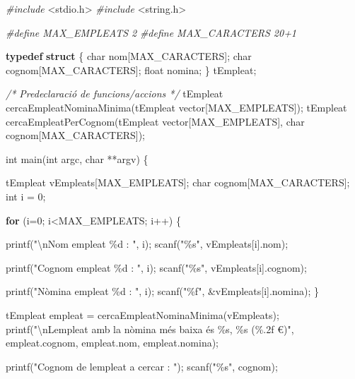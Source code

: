 \documentclass[]{book}
\newenvironment{Shaded}{\begin{snugshade}}{\end{snugshade}}
\newcommand{\CommentTok}[1]{\textcolor[rgb]{0.56,0.35,0.01}{\textit{#1}}}
\newcommand{\ControlFlowTok}[1]{\textcolor[rgb]{0.13,0.29,0.53}{\textbf{#1}}}
\newcommand{\DataTypeTok}[1]{\textcolor[rgb]{0.13,0.29,0.53}{#1}}
\newcommand{\DecValTok}[1]{\textcolor[rgb]{0.00,0.00,0.81}{#1}}
\newcommand{\ImportTok}[1]{#1}
\newcommand{\KeywordTok}[1]{\textcolor[rgb]{0.13,0.29,0.53}{\textbf{#1}}}
\newcommand{\NormalTok}[1]{#1}
\newcommand{\PreprocessorTok}[1]{\textcolor[rgb]{0.56,0.35,0.01}{\textit{#1}}}
\newcommand{\SpecialCharTok}[1]{\textcolor[rgb]{0.00,0.00,0.00}{#1}}
\newcommand{\StringTok}[1]{\textcolor[rgb]{0.31,0.60,0.02}{#1}}
\begin{document}
\begin{Shaded}
\begin{Highlighting}[]
\PreprocessorTok{\#include }\ImportTok{\textless{}stdio.h\textgreater{}}
\PreprocessorTok{\#include }\ImportTok{\textless{}string.h\textgreater{}}

\PreprocessorTok{\#define MAX\_EMPLEATS 2}
\PreprocessorTok{\#define MAX\_CARACTERS 20+1}

\KeywordTok{typedef} \KeywordTok{struct}\NormalTok{ \{}
    \DataTypeTok{char}\NormalTok{ nom[MAX\_CARACTERS];}
    \DataTypeTok{char}\NormalTok{ cognom[MAX\_CARACTERS];}
    \DataTypeTok{float}\NormalTok{ nomina;}
\NormalTok{\} tEmpleat;}

\CommentTok{/* Predeclaració de funcions/accions */}
\NormalTok{tEmpleat cercaEmpleatNominaMinima(tEmpleat vector[MAX\_EMPLEATS]);}
\NormalTok{tEmpleat cercaEmpleatPerCognom(tEmpleat vector[MAX\_EMPLEATS], }\DataTypeTok{char}\NormalTok{ cognom[MAX\_CARACTERS]);}

\DataTypeTok{int}\NormalTok{ main(}\DataTypeTok{int}\NormalTok{ argc, }\DataTypeTok{char}\NormalTok{ **argv) \{}

\NormalTok{    tEmpleat vEmpleats[MAX\_EMPLEATS];}
    \DataTypeTok{char}\NormalTok{ cognom[MAX\_CARACTERS];}
    \DataTypeTok{int}\NormalTok{ i = }\DecValTok{0}\NormalTok{;}

    \ControlFlowTok{for}\NormalTok{ (i=}\DecValTok{0}\NormalTok{; i\textless{}MAX\_EMPLEATS; i++) \{}
     
\NormalTok{        printf(}\StringTok{"}\SpecialCharTok{\textbackslash{}n}\StringTok{Nom empleat \%d : "}\NormalTok{, i);}
\NormalTok{        scanf(}\StringTok{"\%s"}\NormalTok{, vEmpleats[i].nom);}
        
\NormalTok{        printf(}\StringTok{"Cognom empleat \%d : "}\NormalTok{, i);}
\NormalTok{        scanf(}\StringTok{"\%s"}\NormalTok{, vEmpleats[i].cognom);}
        
\NormalTok{        printf(}\StringTok{"Nòmina empleat \%d : "}\NormalTok{, i);}
\NormalTok{        scanf(}\StringTok{"\%f"}\NormalTok{, \&vEmpleats[i].nomina);}
\NormalTok{    \}}

\NormalTok{    tEmpleat empleat = cercaEmpleatNominaMinima(vEmpleats);}
\NormalTok{    printf(}\StringTok{"}\SpecialCharTok{\textbackslash{}n}\StringTok{L\textquotesingle{}empleat amb la nòmina més baixa és \%s, \%s (\%.2f €)"}\NormalTok{, empleat.cognom, empleat.nom, empleat.nomina);}

\NormalTok{    printf(}\StringTok{"Cognom de l\textquotesingle{}empleat a cercar : "}\NormalTok{);}
\NormalTok{    scanf(}\StringTok{"\%s"}\NormalTok{, cognom);}


\end{Highlighting}
\end{Shaded}
\end{document}
